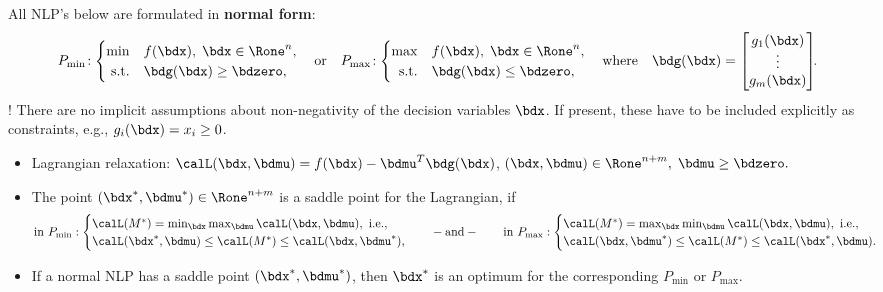 \documentclass[a4paper]{article}
\begin{document}
  All NLP's below are formulated in \textbf{normal form}:
  \[
    P_{\min}\!:
    \begin{cases}
      \min        & f(\bdx),\; \bdx\in\Rone^n, \\
      \hfill
      \text{s.t.} & \bdg(\bdx)\ge\bdzero,
    \end{cases}
    \quad
    \text{or}
    \quad
    P_{\max}\!:
    \begin{cases}
      \max        & f(\bdx),\; \bdx\in\Rone^n, \\
      \hfill
      \text{s.t.} & \bdg(\bdx)\le\bdzero,
    \end{cases}
    \quad
    \text{where}
    \quad
    \bdg(\bdx)
    =
    \begin{bmatrix}
      g_1(\bdx)\\[-2pt] \vdots\\ g_m(\bdx)
    \end{bmatrix}
    \mkern-6mu.
  \]
 \Obs! There are no implicit assumptions about non-negativity of the decision variables $\bdx$.
 If present, these have to be included explicitly as constraints, e.g., $g_i(\bdx)=x_i\ge0$.

 \begin{itemize}
   \item Lagrangian relaxation:
    $
      \calL(\bdx,\bdmu)
      = f(\bdx)
      -
      \bdmu^T\bdg(\bdx)
  $,
  $
  (\bdx,\bdmu)\in\Rone^{n+m},\;
    \bdmu\ge\bdzero.
   $

  \item The point $(\bdx^*,\bdmu^*)\in\Rone^{n+m}$ is a saddle point for the Lagrangian, if
    \[
      \text{in}~P_{\min}:
      \begin{cases}
          \calL(M^*) = \min_{\bdx}\max_{\bdmu} \calL(\bdx  ,\bdmu),~\text{i.e.}, \\
          \calL(\bdx^*,\bdmu  ) \le \calL(M^*) \le \calL(\bdx  ,\bdmu^*),
        \end{cases}
        \hspace{1em}
        -\text{and}-
        \hspace{2em}
      \text{in}~P_{\max}:
        \begin{cases}
          \calL(M^*) = \max_{\bdx}\min_{\bdmu} \calL(\bdx  ,\bdmu),~\text{i.e.}, \\
          \calL(\bdx  ,\bdmu^*) \le \calL(M^*) \le \calL(\bdx^*,\bdmu).
      \end{cases}
    \]

    \item If a normal NLP has a saddle point $(\bdx^*,\bdmu^*)$, then $\bdx^*$
    is an optimum for the corresponding
    $P_{\min}$ or
    $P_{\max}$.

 \end{itemize}
\end{document}
